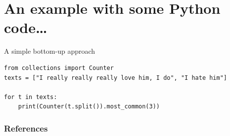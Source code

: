 \documentclass[compress]{beamer}
\begin{document}
\section{An example with some Python code\dots}

\begin{frame}[fragile]{A simple bottom-up approach}
\begin{lstlisting}
from collections import Counter
texts = ["I really really really love him, I do", "I hate him"]

for t in texts:
    print(Counter(t.split()).most_common(3))
\end{lstlisting}

\begin{lstlistingoutput}
\end{lstlistingoutput}
\end{frame}


\begin{frame}
	\frametitle{References}
	\printbibliography
\end{frame}
	
\end{document}
